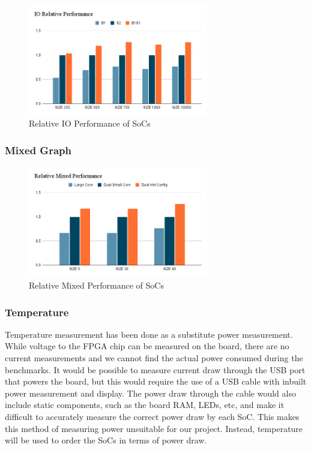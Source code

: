 \begin{figure}[H]
    \centering
    \includegraphics[width=0.7\textwidth]{img/IO Relative Performance.png}
    \caption{Relative IO Performance of SoCs}
    \label{fig:IO_relative_graph}
\end{figure}

\subsubsection{Mixed Graph}

\begin{figure}[H]
    \centering
    \includegraphics[width=0.7\textwidth]{img/Relative Mixed Performance.png}
    \caption{Relative Mixed Performance of SoCs}
    \label{fig:mix_relative_graph}
\end{figure}

\subsubsection{Temperature}
Temperature measurement has been done as a substitute power measurement. While voltage to the FPGA chip can be measured on the board, there are no current measurements and we cannot find the actual power consumed during the benchmarks. It would be possible to measure current draw through the USB port that powers the board, but this would require the use of a USB cable with inbuilt power measurement and display. The power draw through the cable would also include static components, such as the board RAM, LEDs, etc, and make it difficult to accurately measure the correct power draw by each SoC. This makes this method of measuring power unsuitable for our project. Instead, temperature will be used to order the SoCs in terms of power draw. 

